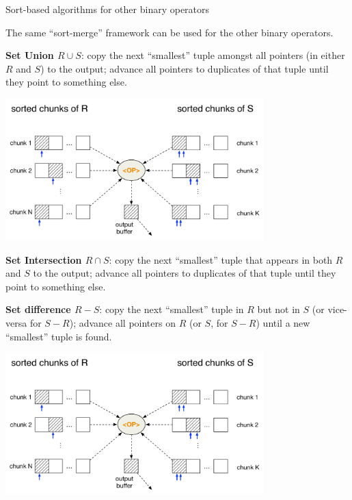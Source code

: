 %
%
\begin{frame}{Sort-based algorithms for other binary operators}
\label{generic_sort_merge_set_operator}

The same ``sort-merge'' framework can be used for the other binary operators.

\textbf{Set Union $R\cup S$}: copy the next ``smallest'' tuple amongst all pointers (in either $R$ and $S$) to the output; advance all pointers to duplicates of that tuple until they point to something else.

\begin{center}
\includegraphics[width=0.75\textwidth]{figures/merge_OP.pdf}
\end{center}
\end{frame}


%
%
\begin{frame}


\textbf{Set Intersection $R\cap S$}: copy the next ``smallest'' tuple that appears in both $R$ and $S$ to the output; advance all pointers to duplicates of that tuple until they point to something else.

\textbf{Set difference $R-S$}: copy the next ``smallest'' tuple in $R$ but not in $S$ (or vice-versa for $S-R$); advance all pointers on $R$ (or $S$, for $S-R$) until a new ``smallest'' tuple is found.

\begin{center}
\includegraphics[width=0.75\textwidth]{figures/merge_OP.pdf}
\end{center}
\end{frame}